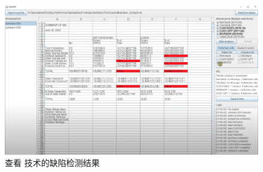 \begin{figure}[tbp]    
    \centering
    \includegraphics[width=\textwidth]{figure/sg/sguard-5.png}
    \caption{查看 \wa 技术的缺陷检测结果}
    \label{figure-sg5}
\end{figure}